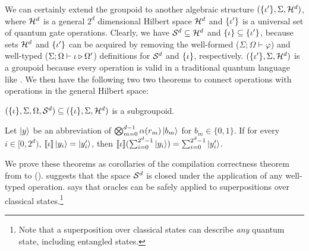 We can certainly extend the groupoid to another algebraic structure $(\{\iota'\},\Sigma,\mathcal{H}^d)$, where $\mathcal{H}^d$ is a general $2^d$ dimensional Hilbert space $\mathcal{H}^d$ and $\{\iota'\}$ is a universal set of quantum gate operations.
Clearly, we have $\mathcal{S}^d \subseteq \mathcal{H}^d$ and $\{\iota\} \subseteq \{\iota'\}$, because sets $\mathcal{H}^d$ and $\{\iota'\}$ can be acquired by removing the well-formed ($\Sigma;\Omega \vdash \varphi$) and well-typed ($\Sigma;\Omega \vdash \iota \triangleright \Omega'$) definitions for $\mathcal{S}^d$ and $\{\iota\}$, respectively.
$(\{\iota'\},\Sigma,\mathcal{H}^d)$ is a groupoid because every \oqasm operation is valid in a traditional quantum language like \sqir. We then have the following two two theorems to connect \oqasm operations with operations in the general Hilbert space: 

 \begin{theorem}\label{thm:subgroupoid}\rm
   $(\{\iota\},\Sigma, \Omega,\mathcal{S}^d) \subseteq (\{\iota\},\Sigma,\mathcal{H}^d)$ is a subgroupoid.
 \end{theorem}

\begin{theorem}\label{thm:sem-same}\rm
Let $\left\vert{y}\right\rangle$ be an abbreviation of $\bigotimes_{m=0}^{d-1} \alpha(r_m) \left\vert{b_m}\right\rangle$ for $b_m \in \{0,1\}$.
If for every $i\in [0,2^d)$, $\llbracket \iota \rrbracket\left\vert{y_i}\right\rangle=\left\vert{y'_i}\right\rangle$, then $\llbracket \iota \rrbracket (\sum_{i=0}^{2^d-1} \left\vert{y_i}\right\rangle)=\sum_{i=0}^{2^d-1} \left\vert{y'_i}\right\rangle$.
\end{theorem}

We prove these theorems as corollaries of the compilation correctness theorem from \oqasm to \sqir (). 
 suggests that the space $\mathcal{S}^d$ is closed under the application of any well-typed \oqasm operation.
 says that \oqasm oracles can be safely applied to superpositions over classical states.\footnote{Note that a superposition over classical states can describe \emph{any} quantum state, including entangled states.}

